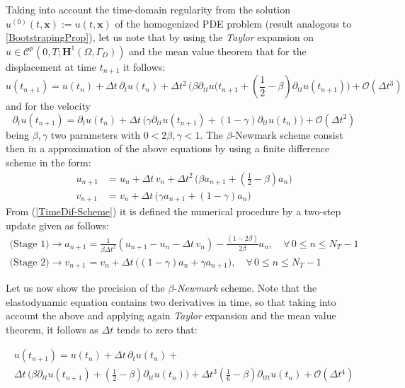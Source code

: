 Taking into account the time-domain regularity from the solution $u^{(0)}(t, \mathbf{x}) := u(t,\mathbf{x})$ of the homogenized PDE problem (result analogous to \ref{BootstrapingProp}), let us note that by using the \textit{Taylor} expansion on $u \in \mathcal{C}^{p}(0,T;\mathbf{H}^1(\Omega, \Gamma_D))$ and the mean value theorem that for the displacement at time $t_{n+1}$ it follows:
\begin{equation*}
    u(t_{n+1}) = u(t_n) + \Delta t \, \partial_{t} u(t_n) + \Delta t^2 \, \big( \beta \partial_{tt} u(t_{n+1} + (\frac{1}{2} - \beta) \partial_{tt} u(t_{n+1}) \big) + \mathcal{O}(\Delta t^3)    
\end{equation*}
and for the velocity
\begin{equation*}
    \partial_{t} u(t_{n+1}) = \partial_{t} u (t_{n}) + \Delta t \, \big( \gamma \partial_{tt} u(t_{n+1}) + (1-\gamma) \partial_{tt} u(t_n) \big) + \mathcal{O}(\Delta t^2)
\end{equation*}
being $\beta, \gamma$ two parameters with $0 < 2\beta, \gamma < 1$.
The $\beta$-Newmark scheme consist then in a approximation of the above equations by using a finite difference scheme in the form:
\begin{align}
    \label{TimeDif-Scheme}
    u_{n+1} &= u_{n} + \Delta t\, v_{n} + \Delta t^2 \, \big( \beta a_{n+1} + (\frac{1}{2} - \beta) a_n \big) \\
    v_{n+1} &= v_n + \Delta t\, \big( \gamma a_{n+1} + (1-\gamma) a_{n} \big)
\end{align}
From (\ref{TimeDif-Scheme}) it is defined the numerical procedure by a two-step update given as follows:
\begin{align}
    \label{TwoStage-Update}
    \text{(Stage 1)}\longrightarrow  a_{n+1} &= \frac{1}{\beta \Delta t^2} ( u_{n+1}-u_n - \Delta t \, v_n) - \frac{(1-2\beta)}{2 \beta} a_n, \quad \forall \, 0 \leq n \leq N_T-1 \\
    \text{(Stage 2)}\longrightarrow v_{n+1} &= v_n + \Delta t \, \big( (1-\gamma) a_n + \gamma a_{n+1} \big), \quad \forall \, 0 \leq n \leq N_T-1
\end{align}

Let us now show the precision of the $\beta$-\textit{Newmark} scheme. Note that the elastodynamic equation contains two derivatives in time, so that taking into account the above and applying again \textit{Taylor} expansion and the mean value theorem, it follows as $\Delta t$ tends to zero that:

\begin{multline}
    u(t_{n+1}) = u(t_{n}) + \Delta t \, \partial_{t} u(t_n) + \\
    \Delta t \, \big( \beta \partial_{tt} u(t_{n+1}) + (\frac{1}{2}- \beta) \partial_{tt} u(t_n) \big) + \Delta t^3 (\frac{1}{6}-\beta) \partial_{ttt}u(t_n) + \mathcal{O}(\Delta t^4)
\end{multline}

